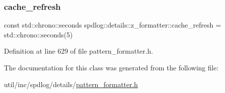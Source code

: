 \subsubsection{\texorpdfstring{cache\+\_\+refresh}{cache\_refresh}}
{\footnotesize\ttfamily const std\+::chrono\+::seconds spdlog\+::details\+::z\+\_\+formatter\+::cache\+\_\+refresh = std\+::chrono\+::seconds(5)}



Definition at line 629 of file pattern\+\_\+formatter.\+h.



The documentation for this class was generated from the following file\+:\begin{DoxyCompactItemize}
\item 
util/inc/spdlog/details/\hyperlink{pattern__formatter_8h}{pattern\+\_\+formatter.\+h}\end{DoxyCompactItemize}
